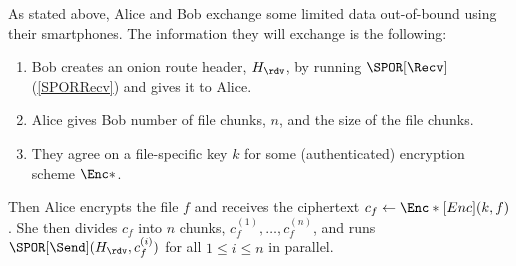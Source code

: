 As stated above, Alice and Bob exchange some limited data out-of-bound using 
their smartphones.
The information they will exchange is the following:
\begin{enumerate}
  \item Bob creates an onion route header, \(H_\rdv\), by running 
    \(\SPOR[\Recv]\) (\cref{SPORRecv}) and gives it to Alice.
  \item Alice gives Bob number of file chunks, \(n\), and the size of the file 
    chunks.
  \item They agree on a file-specific key \(k\) for some (authenticated) 
    encryption scheme \(\Enc*\).
\end{enumerate}
Then Alice encrypts the file \(f\) and receives the ciphertext \(c_f\gets 
  \Enc*[Enc](k, f)\).
She then divides \(c_f\) into \(n\) chunks, \(c_f^{(1)}, \dotsc, c_f^{(n)}\), 
and runs \(\SPOR[\Send](H_\rdv, c_f^{(i)})\) for all \(1\leq i\leq n\) in 
parallel.
